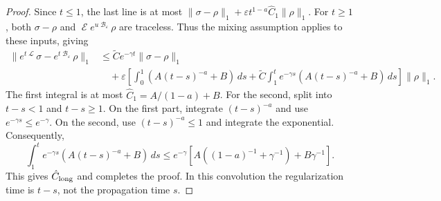 \documentclass[11pt]{article}
\theoremstyle{myplain}
\theoremstyle{mydefinition}
\theoremstyle{remark}
\DeclareMathOperator{\cB}{\mathcal{B}}
\DeclareMathOperator{\cE}{\mathcal{E}}
\DeclareMathOperator{\cL}{\mathcal{L}}
\DeclareMathOperator{\1}{\mathds{1}}
\begin{document}
\begin{proof}
        
        Since $t\leq1$, the last line is at most $\|\sigma-\rho\|_1+\varepsilon t^{1-a}\hat C_1\|\rho\|_1$. For $t\geq1$, both $\sigma-\rho$ and $\cE e^{u\cB_\varepsilon}\rho$ are traceless. Thus the mixing assumption applies to these inputs, giving
        \begin{equation*}
            \begin{aligned}
                \|e^{t\cL}\sigma-e^{t\cB_\varepsilon}\rho\|_1
                &\leq\widetilde C e^{-\gamma t}\|\sigma-\rho\|_1\\
                &\quad+\varepsilon\left[\int_0^1(A(t-s)^{-a}+B)\,ds
                +\widetilde C\int_1^t e^{-\gamma s}(A(t-s)^{-a}+B)\,ds\right]\|\rho\|_1.
            \end{aligned}
        \end{equation*}
        The first integral is at most $\hat C_1=A/(1-a)+B$. For the second, split into $t-s<1$ and $t-s\geq1$. On the first part, integrate $(t-s)^{-a}$ and use $e^{-\gamma s}\leq e^{-\gamma}$. On the second, use $(t-s)^{-a}\leq1$ and integrate the exponential. Consequently,
        \begin{equation}\label{eq:mixing-convolution-bound}
            \int_1^t e^{-\gamma s}(A(t-s)^{-a}+B)\,ds
            \leq e^{-\gamma}\left[A\left((1-a)^{-1}+\gamma^{-1}\right)+B\gamma^{-1}\right].
        \end{equation}
        This gives $\hat C_{\rm long}$ and completes the proof. In this convolution the regularization time is $t-s$, not the propagation time $s$.
        
    \end{proof}
\end{document}
